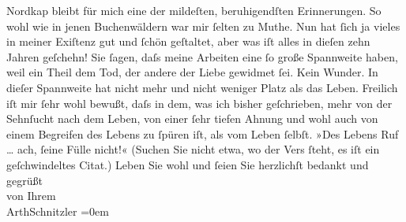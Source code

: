 \begin{ledgroupsized}[t]{13cm}
{{{                  Nordkap}}}\label{K_L01590_2h} bleibt für mich eine der mildeſten,
               beruhigendſten Erinnerungen. So wohl wie in jenen Buchenwäldern war mir ſelten zu
               Muthe. Nun hat ſich ja vieles in meiner Exiſtenz gut und ſchön geſtaltet, aber was
               iſt alles in dieſen zehn Jahren geſchehn! Sie ſagen, daſs meine Arbeiten eine ſo
               große Spannweite haben, weil ein Theil dem Tod, der andere der Liebe gewidmet {\pb}ſei. Kein Wunder. In dieſer Spannweite hat nicht
               mehr und nicht weniger Platz als das Leben. Freilich iſt mir ſehr wohl bewußt, daſs
               in dem, was ich bisher geſchrieben, mehr von der Sehnſucht nach dem Leben, von einer
               ſehr tiefen Ahnung und wohl auch von einem Begreifen des Lebens zu ſpüren iſt, als
               vom Leben ſelbſt. »Des Lebens Ruf {\dots} ach, ſeine Fülle
               nicht!« (Suchen Sie nicht etwa, wo der Vers {\pb}ſteht, es iſt ein geſchwindeltes Citat.)\pend
           \pstart
           Leben Sie wohl und ſeien Sie herzlichſt bedankt und gegrüßt{\\[\baselineskip]}von Ihrem{\\[\baselineskip]}\spacefill\mbox{ArthSchnitzler}\pend
           \leftskip=0em{}          \endnumbering{}\end{ledgroupsized}  \newcommand{\dateiname}{L01590}\newcommand{\titel}{Arthur Schnitzler an Georg Brandes, 13. 3. 1906}\newcommand{\editorInnen}{Martin Anton Müller und Gerd-Hermann Susen}
            \footnotesize
\begin{ledgroupsized}[t]{11.5cm}
\end{ledgroupsized}
         
      